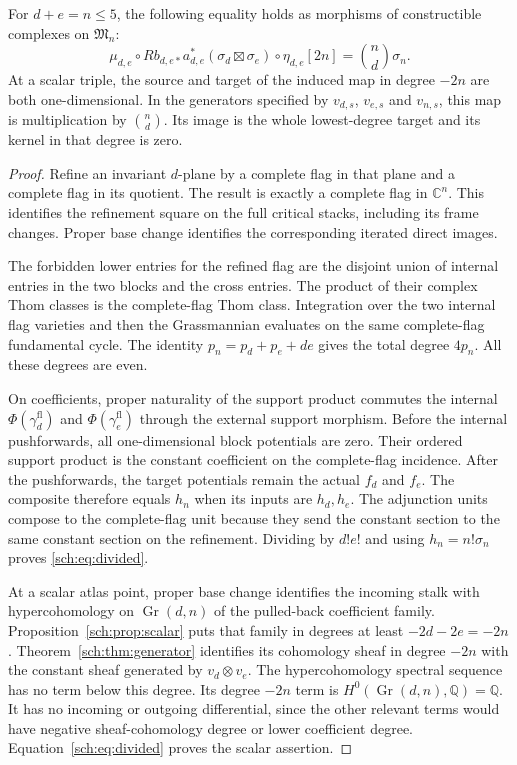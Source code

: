 \begin{theorem}
\label{sch:thm:images}
For $d+e=n\leq5$, the following equality holds as morphisms of
constructible complexes on $\mathfrak M_n$:
\begin{equation}
 \mu_{d,e}\circ Rb_{d,e*}a_{d,e}^*
       (\sigma_d\boxtimes\sigma_e)\circ\eta_{d,e}[2n]
       =\binom nd\sigma_n.
 \label{sch:eq:divided}
\end{equation}
At a scalar triple, the source and target of the induced map in
degree $-2n$ are both one-dimensional. In the generators specified
by $v_{d,s}$, $v_{e,s}$ and $v_{n,s}$, this map is multiplication
by $\binom nd$. Its image is the whole lowest-degree target and
its kernel in that degree is zero.
\end{theorem}

\begin{proof}
Refine an invariant $d$-plane by a complete flag in that plane and
a complete flag in its quotient. The result is exactly a complete
flag in $\mathbb C^n$. This identifies the refinement square on
the full critical stacks, including its frame changes.
Proper base change identifies the corresponding iterated direct images.

The forbidden lower entries for the refined flag are the disjoint
union of internal entries in the two blocks and the cross entries.
The product of their complex Thom classes is the complete-flag Thom
class. Integration over the two internal flag varieties and then
the Grassmannian evaluates on the same complete-flag fundamental cycle.
The identity $p_n=p_d+p_e+de$ gives the total degree $4p_n$.
All these degrees are even.

On coefficients, proper naturality of the support product commutes
the internal $\Phi(\gamma_d^{\mathrm{fl}})$ and
$\Phi(\gamma_e^{\mathrm{fl}})$ through the external support morphism.
Before the internal pushforwards, all one-dimensional block potentials
are zero. Their ordered support product is the constant coefficient
on the complete-flag incidence. After the pushforwards, the target
potentials remain the actual $f_d$ and $f_e$.
The composite therefore equals $h_n$ when its inputs are $h_d,h_e$.
The adjunction units compose to the complete-flag unit because they
send the constant section to the same constant section on the refinement.
Dividing by $d!e!$ and using $h_n=n!\sigma_n$ proves
\eqref{sch:eq:divided}.

At a scalar atlas point, proper base change identifies the incoming
stalk with hypercohomology on $\operatorname{Gr}(d,n)$ of the
pulled-back coefficient family. Proposition~\ref{sch:prop:scalar}
puts that family in degrees at least $-2d-2e=-2n$.
Theorem~\ref{sch:thm:generator} identifies its cohomology sheaf in
degree $-2n$ with the constant sheaf generated by $v_d\otimes v_e$.
The hypercohomology spectral sequence has no term below this degree.
Its degree $-2n$ term is
$H^0(\operatorname{Gr}(d,n),\mathbb Q)=\mathbb Q$.
It has no incoming or outgoing differential, since the other relevant
terms would have negative sheaf-cohomology degree or lower coefficient
degree. Equation~\eqref{sch:eq:divided} proves the scalar assertion.
\end{proof}

